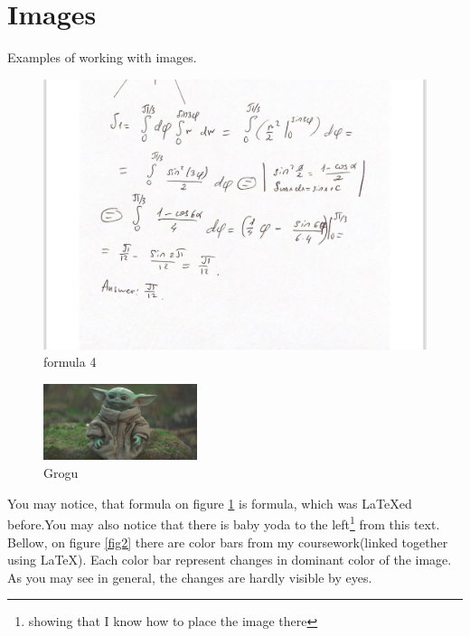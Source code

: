 \documentclass[a4paper, 12pt]{article}
\begin{document}
\section{Images}
Examples of working with images.

\begin{figure}[h]
    \centering
    \includegraphics[width=1\linewidth, right]{im1.png}
    \caption{formula 4}
    \label{fig1}
\end{figure}
\begin{figure}
    \centering
    \includegraphics[width=0.4\textwidth]{im2.png}
    \caption{Grogu}
\end{figure}
You may notice, that formula on figure \ref{fig1} is formula, which was LaTeXed before.You may also notice that there is baby yoda\cite{rocha2022baby} to the left\footnote[1]{showing that I know how to place the image there} from this text. Bellow, on figure \ref{fig2} there are color bars from my coursework(linked together using LaTeX). Each color bar represent changes in dominant color of the image. As you may see in general, the changes are hardly visible by eyes.
\end{document}
